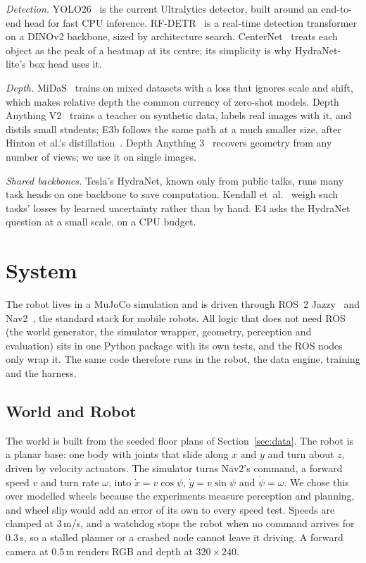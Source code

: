 \documentclass[conference]{IEEEtran}
\begin{document}
\emph{Detection.} YOLO26~\cite{jocher2026yolo26} is the current Ultralytics
detector, built around an end-to-end head for fast CPU inference.
RF-DETR~\cite{robinson2026rfdetr} is a real-time detection transformer on a
DINOv2 backbone, sized by architecture search. CenterNet~\cite{zhou2019objects}
treats each object as the peak of a heatmap at its centre; its simplicity is
why HydraNet-lite's box head uses it.

\emph{Depth.} MiDaS~\cite{ranftl2022midas} trains on mixed datasets with a
loss that ignores scale and shift, which makes relative depth the common
currency of zero-shot models. Depth Anything V2~\cite{yang2024depthv2}
trains a teacher on synthetic data, labels real images with it, and distils
small students; E3b follows the same path at a much smaller size, after
Hinton et al.'s distillation~\cite{hinton2015distilling}. Depth Anything
3~\cite{lin2026depth3} recovers geometry from any number of views; we use it
on single images.

\emph{Shared backbones.} Tesla's HydraNet, known only from public talks, runs
many task heads on one backbone to save computation. Kendall
et~al.~\cite{kendall2018multitask} weigh such tasks' losses by learned
uncertainty rather than by hand. E4 asks the HydraNet question at a small
scale, on a CPU budget.

\section{System}
\label{sec:system}

The robot lives in a MuJoCo simulation and is driven through ROS~2
Jazzy~\cite{macenski2022ros2} and Nav2~\cite{macenski2020marathon}, the
standard stack for mobile robots. All logic that does not need ROS (the world
generator, the simulator wrapper, geometry, perception and evaluation) sits in
one Python package with its own tests, and the ROS nodes only wrap it. The
same code therefore runs in the robot, the data engine, training and the
harness.

\subsection{World and Robot}

The world is built from the seeded floor plans of Section~\ref{sec:data}. The
robot is a planar base: one body with joints that slide along $x$ and $y$ and
turn about $z$, driven by velocity actuators. The simulator turns Nav2's
command, a forward speed $v$ and turn rate $\omega$, into $\dot x = v\cos\psi$,
$\dot y = v\sin\psi$ and $\dot\psi = \omega$. We chose this over modelled
wheels because the experiments measure perception and planning, and wheel
slip would add an error of its own to every speed test. Speeds are clamped at
3\,m/s, and a watchdog stops the robot when no command arrives for 0.3\,s, so
a stalled planner or a crashed node cannot leave it driving. A forward camera
at 0.5\,m renders RGB and depth at $320\times240$.
\end{document}
